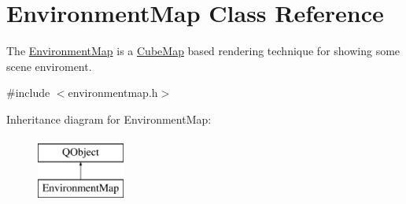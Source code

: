 \hypertarget{class_environment_map}{\section{Environment\+Map Class Reference}
\label{class_environment_map}
}


The \hyperlink{class_environment_map}{Environment\+Map} is a \hyperlink{class_cube_map}{Cube\+Map} based rendering technique for showing some scene enviroment.  




{\ttfamily \#include $<$environmentmap.\+h$>$}

Inheritance diagram for Environment\+Map\+:\begin{figure}[H]
\begin{center}
\leavevmode
\includegraphics[height=2.000000cm]{class_environment_map}
\end{center}
\end{figure}
